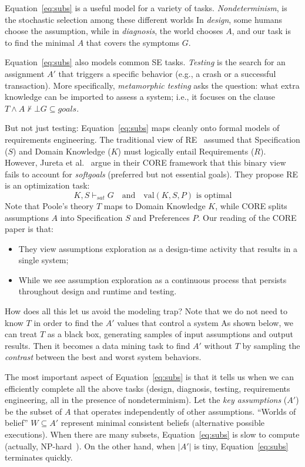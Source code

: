 \documentclass[runningheads]{llncs}
\begin{document}
Equation~\ref{eq:subs} is a useful model for a variety of tasks. {\em Nondeterminism}, is  the stochastic
selection among these different worlds
 In  {\em design}, some humans choose the assumption, while
 in {\em diagnosis}, the world chooses $A$, and our task is to find the minimal $A$ that covers the symptoms $G$. 

Equation~\ref{eq:subs} also models common SE tasks.
 {\em Testing} is  the search for an assignment $A'$ that triggers a specific behavior (e.g., a crash or a successful transaction).  More specifically, {\em metamorphic testing}  asks the question: what extra knowledge can be imported to assess a system; i.e., it focuses on the clause
$T \wedge A  \not\vdash \bot 
 G \subseteq \mathit{goals}$.
 
But not just testing: Equation~\ref{eq:subs} maps cleanly onto formal models of 
requirements engineering.
The traditional view of
RE~\cite{Zave1997} assumed that Specification ($S$) and Domain Knowledge
($K$) must logically entail Requirements ($R$). However, Jureta et
al.~\cite{Jureta2008} argue in their CORE framework that this binary
view fails to account for \textit{softgoals} (preferred but not
essential goals). They propose RE is an optimization task:
\begin{equation}\label{core}
K, S \vdash_{sat} G \quad \text{and} \quad \text{val}(K, S, P)
\text{ is optimal}
\end{equation}
Note that Poole's  theory $T$ maps to Domain Knowledge $K$,
while CORE splits assumptions $A$ into Specification $S$ and
Preferences $P$. 
Our reading of the CORE
paper is that:
\begin{itemize}
\item
They view  assumptions exploration as a  design-time activity that results in a single system;
\item
While we see assumption exploration as   a continuous process that persists throughout design and runtime and testing.
\end{itemize}
How does all  this let us avoid
the modeling trap?
Note that we do not need to know $T$ in order to find the $A'$ values that control a system
As shown below,  we can treat $T$ as a black box, generating
samples of input assumptions and output results. Then it becomes a data mining task
to  find $A'$ without $T$ by  sampling the
\textit{contrast} between the best and worst system behaviors.


The most important aspect of 
Equation~\ref{eq:subs} is that it tells
us when we can efficiently complete all the above tasks (design, diagnosis, testing, requirements engineering, all in the presence of nondeterminism).
Let the \textit{key assumptions} ($A'$) be the subset of $A$ that
operates independently of other assumptions. ``Worlds of belief'' $W
\subseteq A'$ represent minimal consistent beliefs (alternative
possible executions).   
When there are many subsets, 
Equation~\ref{eq:subs} is slow to compute
(actually, NP-hard~\cite{Bylander1991}). On the other hand, when $|A'|$ is tiny,
Equation~\ref{eq:subs} terminates quickly.
\end{document}
